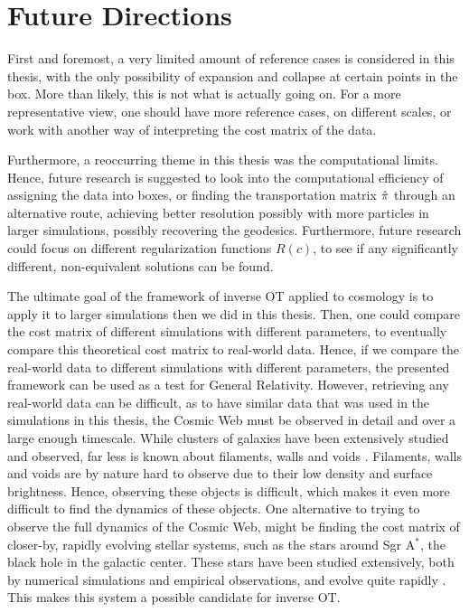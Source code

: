 \section{Future Directions}
First and foremost, a very limited amount of reference cases is considered in this thesis, with the only possibility of expansion and collapse at certain points in the box. More than likely, this is not what is actually going on. For a more representative view, one should have more reference cases, on different scales, or work with another way of interpreting the cost matrix of the data. \par 
Furthermore, a reoccurring theme in this thesis was the computational limits. Hence, future research is suggested to look into the computational efficiency of assigning the data into boxes, or finding the transportation matrix $\hat{\pi}$ through an alternative route, achieving better resolution possibly with more particles in larger simulations, possibly recovering the geodesics. Furthermore, future research could focus on different regularization functions $R(c)$, to see if any significantly different, non-equivalent solutions can be found. \par 
The ultimate goal of the framework of inverse OT applied to cosmology is to apply it to larger simulations then we did in this thesis. Then, one could compare the cost matrix of different simulations with different parameters, to eventually compare this theoretical cost matrix to real-world data. Hence, if we compare the real-world data to different simulations with different parameters, the presented framework can be used as a test for General Relativity. However, retrieving any real-world data can be difficult, as to have similar data that was used in the simulations in this thesis, the Cosmic Web must be observed in detail and over a large enough timescale. While clusters of galaxies have been extensively studied and observed, far less is known about filaments, walls and voids \citep{bos2016}. Filaments, walls and voids are by nature hard to observe due to their low density and surface brightness. Hence, observing these objects is difficult, which makes it even more difficult to find the dynamics of these objects. One alternative to trying to observe the full dynamics of the Cosmic Web, might be finding the cost matrix of closer-by, rapidly evolving stellar systems, such as the stars around Sgr A$^*$, the black hole in the galactic center. These stars have been studied extensively, both by numerical simulations and empirical observations, and evolve quite rapidly \citep{gillessen2009, zwart2023}. This makes this system a possible candidate for inverse OT. 


